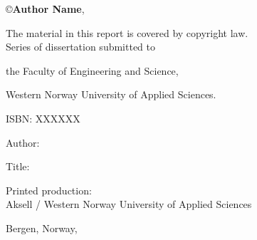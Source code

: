 \documentclass[12pt]{book} %
\title{
    {\fontsize{20}{24}{\color{Maroon}\spaceduppercaps{Thesis Title Goes Here }}}
	\author{
        \textbf{Doctoral Dissertation by}\\ 
        \textbf{Author Name}\vspace{0.5cm}\\
		Thesis submitted for\\ 
        the degree of Philosophiae Doctor (PhD)\\
        in\\ 
        Computer Science:\\
        {\fontsize{12}{14}Software Engineering, Sensor Networks and Engineering Computing}\vspace{0.5cm}\\
		\texttt{[image: logos/logo.pdf]}\vspace{0.5cm}\\
        Department of Computer Science,\\ 
		Electrical Engineering and Mathematical Sciences\vspace{0.3cm}\\
		Faculty of Technology, Environmental and Social Sciences \vspace{0.3cm}\\
		Western Norway University of Applied Sciences
	}
	\date{Month day, year}
}
\begin{document}
\newcommand{\TextSize}{13}
\newcommand{\BaseLineSkip}{15}
\fontsize{\TextSize}{\BaseLineSkip}
\selectfont

\cleardoublepage
\maketitle
\thispagestyle{empty}

\normalsize\vspace*{12cm}
\begin{minipage}{13cm}

\copyright{\textbf{Author Name}}, \textbf{ \the\year{}}\vspace{2ex}  %

The material in this report is covered by copyright law.\vspace{3ex}\\

Series of dissertation submitted to

the Faculty of Engineering and Science,

Western Norway University of Applied Sciences.\vspace{3ex}

ISBN: XXXXXX\vspace{3ex} %


Author: 

Title: \vspace{4ex}

Printed production: \\
Aksell / Western Norway University of Applied Sciences \vspace{3ex}

Bergen, Norway, \the\year{}
\end{minipage}

\ifDraftMargin
\fi


\end{document}
